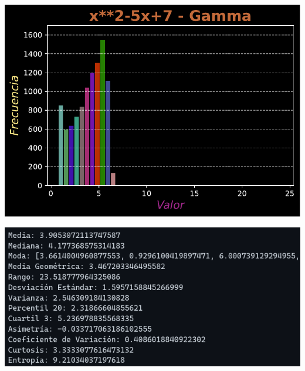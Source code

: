 \documentclass[11pt]{article} %
\begin{document}
	\begin{multicols}{2}
		\begin{minipage}{\linewidth}
			\centering
			\includegraphics[width=1\linewidth]{../transformaciones/cuad_gamma2.pdf}
			\label{fig:cuadGammaHist}
		\end{minipage}
		\vfill\columnbreak
		\begin{minipage}{\linewidth}
			\centering
			\includegraphics[width=1\linewidth]{../transformaciones/cuad_gamma3.png}
			\label{cuadGammaMet}
		\end{minipage}
	\end{multicols}
	
\end{document}
